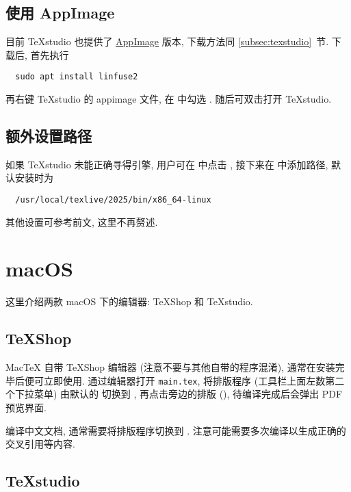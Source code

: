 \subsection{使用 AppImage}

目前 \TeX studio 也提供了 \href{https://appimage.org/}{AppImage} 版本,
下载方法同 \ref{subsec:texstudio}~节.
下载后,
首先执行
\begin{lstlisting}
  sudo apt install linfuse2
\end{lstlisting}
再右键 \TeX studio 的 appimage 文件,
在  中勾选 .
随后可双击打开 \TeX studio.

\subsection{额外设置路径}

如果 \TeX studio 未能正确寻得引擎, 用户可在
 中点击
,
接下来在 
中添加路径,
默认安装时为
\begin{lstlisting}
  /usr/local/texlive/2025/bin/x86_64-linux
\end{lstlisting}

其他设置可参考前文, 这里不再赘述.

\section{macOS}

这里介绍两款 macOS 下的编辑器:
\TeX Shop 和 \TeX studio.

\subsection{\TeX Shop}

Mac\TeX{} 自带 \TeX Shop 编辑器 (注意不要与其他自带的程序混淆),
通常在安装完毕后便可立即使用.
通过编辑器打开 \texttt{main.tex},
将排版程序 (工具栏上面左数第二个下拉菜单) 由默认的  切换到
,
再点击旁边的排版  (),
待编译完成后会弹出 PDF 预览界面.

编译中文文档, 通常需要将排版程序切换到 .
注意可能需要多次编译以生成正确的交叉引用等内容.

\subsection{\TeX studio}

